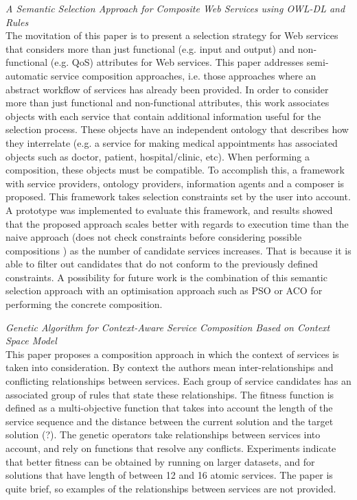 \textit{A Semantic Selection Approach for Composite Web Services using OWL-DL and Rules \cite{DBLP:journals/soca/BoustilMS14}}\\
The movitation of this paper is to present a selection strategy for Web services that considers more than just functional (e.g.
input and output) and non-functional (e.g. QoS) attributes for Web services. This paper addresses semi-automatic service composition
approaches, i.e. those approaches where an abstract workflow of services has already been provided. In order to consider more than
just functional and non-functional attributes, this work associates objects with each service that contain additional information
useful for the selection process. These objects have an independent ontology that describes how they interrelate (e.g. a service
for making medical appointments has associated objects such as doctor, patient, hospital/clinic, etc). When performing a composition,
these objects must be compatible. To accomplish this, a framework with service providers, ontology providers, information agents and a
composer is proposed. This framework takes selection constraints set by the user into account. A prototype was implemented to evaluate
this framework, and results showed that the proposed approach scales better with regards to execution time than the naive approach (does
not check constraints before considering possible compositions ) as the number of candidate services increases. That is because it is
able to filter out candidates that do not conform to the previously defined constraints. A possibility for future work is the combination
of this semantic selection approach with an optimisation approach such as PSO or ACO for performing the concrete composition.

\textit{Genetic Algorithm for Context-Aware Service Composition Based on Context Space Model \cite{zhang2013genetic}}\\
This paper proposes a composition approach in which the context of services is taken into consideration. By context the authors mean
inter-relationships and conflicting relationships between services. Each group of service candidates has an associated group of
rules that state these relationships. The fitness function is defined as a multi-objective function that takes into account the
length of the service sequence and the distance between the current solution and the target solution (?). The genetic operators
take relationships between services into account, and rely on functions that resolve any conflicts. Experiments indicate that
better fitness can be obtained by running on larger datasets, and for solutions that have length of between 12 and 16 atomic
services. The paper is quite brief, so examples of the relationships between services are not provided.



